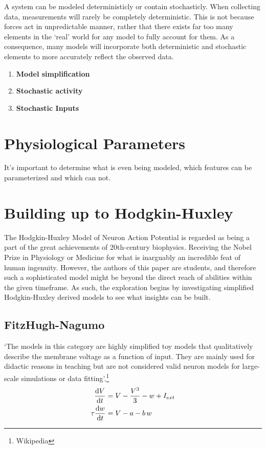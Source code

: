 \documentclass[../../Orator.tex]{subfiles}
\begin{document}
A system can be modeled deterministicly or contain stochasticly. When collecting data, measurements will rarely be completely deterministic. This is not because forces act in unpredictable manner, rather that there exists far too many elements in the `real' world for any model to fully account for them. 
As a consequence, many models will incorporate both deterministic and stochastic elements to more accurately reflect the observed data.
\begin{enumerate}
    \item \textbf{Model simplification}
    \item \textbf{Stochastic activity}
    \item \textbf{Stochastic Inputs}
\end{enumerate}



\newpage
\section{Physiological Parameters}
It's important to determine what is even being modeled, which features can be parameterized and which can not.


\newpage
\section{Building up to Hodgkin-Huxley}

The Hodgkin-Huxley Model of Neuron Action Potential is regarded as being a part of the great achievements of 20th-century biophysics. Receiving the Nobel Prize in Physiology or Medicine for what is inarguably an incredible feat of human ingenuity. However, the authors of this paper are students, and therefore such a sophisticated model might be beyond the direct reach of abilities within the given timeframe. 
As such, the exploration begins by investigating simplified Hodgkin-Huxley derived models to see what insights can be built.

\subsection{FitzHugh-Nagumo}
`The models in this category are highly simplified toy models that qualitatively describe the membrane voltage as a function of input. They are mainly used for didactic reasons in teaching but are not considered valid neuron models for large-scale simulations or data fitting'.\footnote{Wikipedia} 
\begin{subequations}\label{eq:FitNagSys}
    \begin{align}
        \frac{\mathrm{d}\displaystyle V}{\mathrm{d}\displaystyle t} &= V - \frac{V^3}{3} - w + I_{ext} \\ 
        \tau\frac{\mathrm{d}\displaystyle w}{\mathrm{d}\displaystyle t} &= V - a - b\,w 
    \end{align}
\end{subequations}
\end{document}
